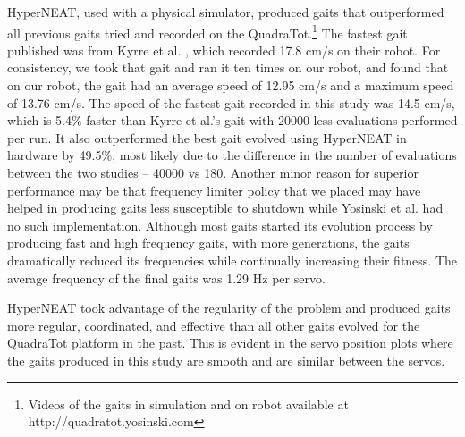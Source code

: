 HyperNEAT, used with a physical simulator, produced gaits that outperformed all previous gaits tried and recorded on the QuadraTot.\footnote{Videos of the gaits in simulation and on robot available at http://quadratot.yosinski.com}
The fastest gait published was from Kyrre et al. \cite{glette}, which recorded 17.8 cm/s on their robot. 
For consistency, we took that gait and ran it ten times on our robot, and found that on our robot, the gait had an average speed of 12.95 cm/s and a maximum speed of 13.76 cm/s.
The speed of the fastest gait recorded in this study was 14.5 cm/s, which is 5.4\% faster than Kyrre et al.'s \cite{glette} gait with 20000 less evaluations performed per run.
It also outperformed the best gait evolved using HyperNEAT in hardware \cite{yos:clune} by 49.5\%, most likely due to the difference in the number of evaluations between the two studies -- 40000 vs 180. 
Another minor reason for superior performance may be that frequency limiter policy that we placed may have helped in producing gaits less susceptible to shutdown while Yosinski et al. \cite{yos:clune} had no such implementation.
Although most gaits started its evolution process by producing fast and high frequency gaits, with more generations, the gaits dramatically reduced its frequencies while continually increasing their fitness. The average frequency of the final gaits was 1.29 Hz per servo. 

HyperNEAT took advantage of the regularity of the problem and produced gaits more regular, coordinated, and effective than all other gaits evolved for the QuadraTot platform in the past.
This is evident in the servo position plots where the gaits produced in this study are smooth and are similar between the servos. 

